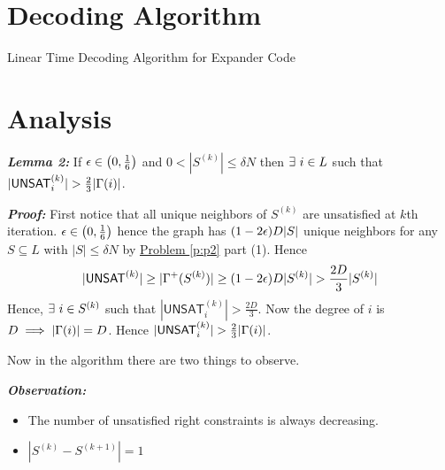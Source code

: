 \documentclass[a4paper, 11pt]{article}
\begin{document}
{\begin{enumerate}
\section{Decoding Algorithm}
	\begin{algorithm}
		\caption{Linear Time Decoding Algorithm for Expander Code}
		\DontPrintSemicolon
	\end{algorithm}
	
\section{Analysis}
\parinf	
\textbf{\textit{Lemma 2:}} \label{exdecodelem1}
	If $\epsilon\in\left( 0,\frac16\right)$ and $0<|S^{(k)}|\leq \delta N$ then $\exists\ i\in L$ such that $|\mathsf{UNSAT}_i^{(k)}|>\frac23|\Gm(i)|$.


\textbf{\textit{Proof:}} \parinn First notice that all unique neighbors of $S^{(k)}$ are unsatisfied at $k$th iteration. $\epsilon\in \left(0,\frac16\right)$ hence  the graph has $(1-2\epsilon)D|S|$ unique neighbors for any $S\subseteq L$ with $|S|\leq \delta N$ by \hyperref[p:p2]{Problem \ref{p:p2}} part (1). Hence $$|\mathsf{UNSAT}^{(k)}|\geq |\Gm^+(S^{(k)})|\geq (1-2\eps)D|S^{(k)}|> \frac{2D}{3}|S^{(k)}|$$Hence, $\exists\ i\in S^{(k)}$ such that $|\mathsf{UNSAT}_i^{(k)}|>\frac{2D}3$. Now the degree of $i$ is $D\implies |\Gamma(i)|=D$. Hence $|\mathsf{UNSAT}_i^{(k)}|>\frac23|\Gm(i)|$. \Qed




Now in the algorithm there are two things to observe.
	
\parinf

\textbf{\textit{Observation:}} \begin{itemize}
	\item The number of unsatisfied right constraints is always decreasing.
	\item $|S^{(k)}-S^{(k+1)}|=1$
\end{itemize}


\end{enumerate}}
\end{document}
